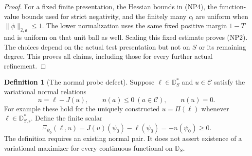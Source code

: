 \documentclass[11pt,a4paper]{article}
\numberwithin{equation}{section}
\theoremstyle{definition}
\newtheorem{definition}[theorem]{Definition}
\theoremstyle{remark}
\begin{document}
\begin{proof}
For a fixed finite presentation, the Hessian bounds in
\textup{(NP4)}, the function-value bounds used for
strict negativity, and the finitely many $c_l$ are
uniform when $\|\phi\|_{2,\mathfrak a}\le1$.
The lower normalization uses the same fixed positive
margin $1-T$ and is uniform on that unit ball as well.
Scaling this fixed estimate proves \textup{(NP2)}.
The choices depend on the actual test presentation but
not on $S$ or its remaining degree.  This proves all
claims, including those for every further actual refinement.
\end{proof}

\begin{definition}[The normal probe defect]
Suppose $\ell\in\mathbb D_S^*$ and $u\in\mathscr C$
satisfy the variational normal relations
\[
 n=\ell-J(u),\qquad n(a)\le0\ (a\in\mathscr C),
                       \qquad n(u)=0.
 \tag{NP6}
\]
For example these hold for the uniquely constructed
$u=\Pi(\ell)$ whenever $\ell\in\mathbb D_{S,\mathrm s}^*$.
Define the finite scalar
\[
        \Xi_{\psi_0}(\ell,u)
                   =J(u)(\psi_0)-\ell(\psi_0)=-n(\psi_0)\ge0.
 \tag{NP7}
\]
The definition requires an existing normal pair.  It
does not assert existence of a variational maximizer for
every continuous functional on $\mathbb D_S$.
\end{definition}
\end{document}
